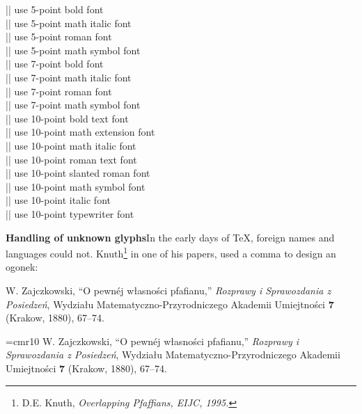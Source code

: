 \begin{multicols}{2}
\noindent|\fivebf| use 5-point bold font\\
|\fivei| use 5-point math italic font\\
|\fiverm| use 5-point roman font\\
|\fivesy| use 5-point math symbol font\\
|\sevenbf| use 7-point bold font\\
|\seveni| use 7-point math italic font\\
|\sevenrm| use 7-point roman font\\
|\sevensy| use 7-point math symbol font\\
|\tenbf| use 10-point bold text font\\
|\tenex| use 10-point math extension font\\
|\teni| use 10-point math italic font\\
|\tenrm| use 10-point roman text font\\
|\tensl| use 10-point slanted roman font\\
|\tensy| use 10-point math symbol font\\
|\tenit| use 10-point italic font\\
|\tentt| use 10-point typewriter font\\
\end{multicols}

\textbf{Handling of unknown glyphs}\quad In the early days of TeX, foreign names and languages could not.
Knuth\footnote{D.E. Knuth, \textit{Overlapping Pfaffians, EIJC, 1995.}} in one of his papers, used a comma to design an ogonek:

\topline
\begin{teX}
\def\og#1{\leavevmode\vtop{\baselineskip0pt \lineskip0pt
  \lineskiplimit0pt \ialign{##\crcr\relax#1\cr
                          \hidewidth\kern.2em
           \dimen0=.0040ex \multiply\dimen0\fontdimen1\font
           \kern-.0156\dimen0`\hidewidth\cr}}}
W. Zaj\og{a}czkowski, ``O pewn\'ej w{\l}asno\'sci pfafianu,''
 {\sl Rozprawy i Sprawozdania z Posiedze\'n}, Wydzia{\l}u
 Matematyczno-Przyrodniczego Akademii Umiej\og{e}tno\'sci {\bf 7}
(Krakow, 1880), 67--74.
\end{teX}
\def\og#1{\leavevmode\vtop{\baselineskip0pt \lineskip0pt
  \lineskiplimit0pt \ialign{##\crcr\relax#1\cr
                          \hidewidth\kern.2em
           \dimen0=.0040ex \multiply\dimen0\fontdimen1\font
           \kern-.0156\dimen0`\hidewidth\cr}}}
{\font\tenrm=cmr10 \tenrm [29]
W. Zaj\og{a}czkowski, ``O pewn\'ej w{\l}asno\'sci pfafianu,''
 {\sl Rozprawy i Sprawozdania z Posiedze\'n}, Wydzia{\l}u
 Matematyczno-Przyrodniczego Akademii Umiej\og{e}tno\'sci {\bf 7}
(Krakow, 1880), 67--74.}

